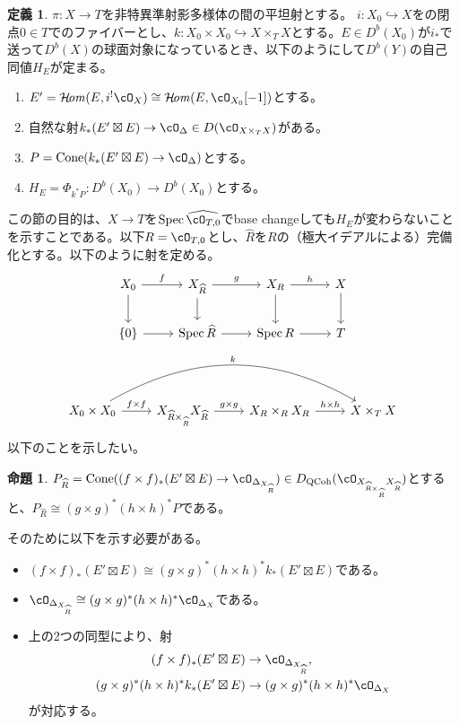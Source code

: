 \documentclass[uplatex, a4paper, dvipdfmx]{jsarticle}
\theoremstyle{definition}
\newtheorem{definition}[theorem]{定義}
\newtheorem{proposition}[theorem]{命題}
\DeclareMathOperator{\CHom}{\mathcal{H}\!\mathit{om}}
\DeclareMathOperator{\Cone}{\mathrm{Cone}}
\DeclareMathOperator{\Spec}{\mathrm{Spec}}
\DeclareMathOperator{\QCoh}{\mathrm{QCoh}}
\begin{document}
\begin{definition}
    $\pi \colon X \to T$を非特異準射影多様体の間の平坦射とする。
    $i \colon X_0 \hookrightarrow X$をの閉点$0 \in T$でのファイバーとし、$k \colon X_0 \times X_0 \hookrightarrow X \times_T X$とする。$E \in D^b(X_0)$が$i_*$で送って$D^b(X)$の球面対象になっているとき、以下のようにして$D^b(Y)$の自己同値$H_E$が定まる。
    \begin{enumerate}
        \item $E' = \CHom(E, i^!\cO_X) \cong \CHom(E, \cO_{X_0}[-1])$とする。
        \item 自然な射$k_*(E' \boxtimes E) \to \cO_{\Delta} \in D(\cO_{X \times_T X})$がある。
        \item $P = \Cone(k_*(E' \boxtimes E) \to \cO_{\Delta})$とする。
        \item $H_E = \Phi_{k^*P} \colon D^b(X_0) \to D^b(X_0)$とする。
    \end{enumerate}
\end{definition}
この節の目的は、$X \to T$を$\Spec \widehat{\cO_{T, 0}}$でbase changeしても$H_E$が変わらないことを示すことである。以下$R = \cO_{T, 0}$とし、$\widehat{R}$を$R$の（極大イデアルによる）完備化とする。以下のように射を定める。
\[
    \begin{tikzcd}
        X_0 \ar[r, "f"] \ar[d]&X_{\widehat{R}} \ar[r, "g"] \ar[d]& X_R \ar[r, "h"] \ar[d]& X \ar[d]\\
        \{0\} \ar[r]& \Spec \widehat{R} \ar[r] & \Spec R \ar[r] & T
    \end{tikzcd}
\]
\[
    \begin{tikzcd}
        X_0 \times X_0 \ar[r, "f \times f"] \ar[rrr, "k", bend left]& X_{\widehat{R} \times_{\widehat{R}}} X_{\widehat{R}} \ar[r, "g \times g"] & X_R \times_R X_R \ar[r, "h \times h"] & X \times_T X
    \end{tikzcd}
\]
以下のことを示したい。
\begin{proposition}
    $P_{\widehat{R}} = \Cone((f \times f)_*(E' \boxtimes E) \to \cO_{\Delta_{X_{\widehat{R}}}}) \in D_{\QCoh}(\cO_{X_{\widehat{R} \times_{\widehat{R}}} X_{\widehat{R}}})$とすると、$P_{\widehat{R}} \cong (g \times g)^*(h \times h)^*P$である。
\end{proposition}
そのために以下を示す必要がある。
\begin{itemize}
    \item $(f \times f)_*(E' \boxtimes E) \cong (g \times g)^*(h \times h)^*k_*(E' \boxtimes E)$である。
    \item $\cO_{\Delta_{X_{\widehat{R}}}} \cong (g \times g)^*(h \times h)^*\cO_{\Delta_X}$である。
    \item 上の2つの同型により、射
          \begin{align}(f \times f)_*(E' \boxtimes E)                  & \to \cO_{\Delta_{X_{\widehat{R}}}},            \\
             (g \times g)^*(h \times h)^*k_*(E' \boxtimes E) & \to (g \times g)^*(h \times h)^*\cO_{\Delta_X}\end{align}
          が対応する。
\end{itemize}
\end{document}
